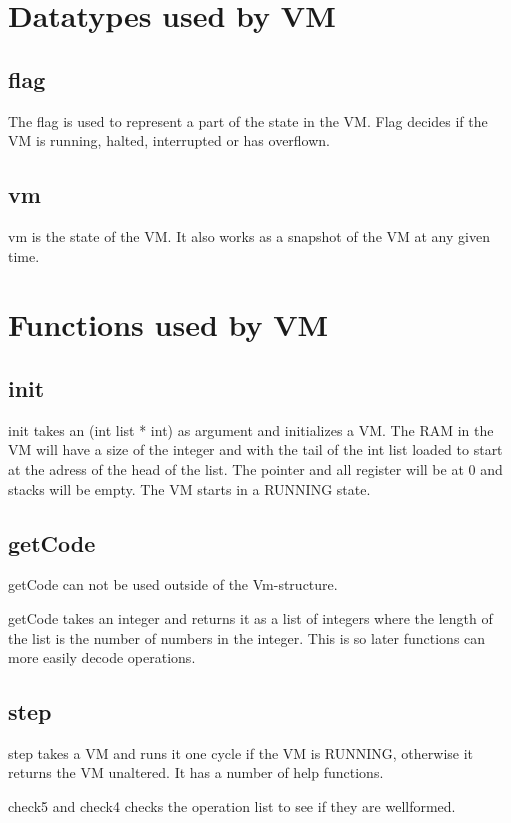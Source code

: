 \section{Datatypes used by VM}

\subsection{flag}
The flag is used to represent a part of the state in the VM. Flag decides if the VM is running, halted, interrupted or has overflown.

\subsection{vm}
vm is the state of the VM. It also works as a snapshot of the VM at any given time. 

\section{Functions used by VM}

\subsection{init}
init takes an (int list * int) as argument and initializes a VM. The RAM in the VM will have a size of the integer and with the tail of the int list loaded to start at the adress of the head of the list. The pointer and all register will be at 0 and stacks will be empty. The VM starts in a RUNNING state.

\subsection{getCode}
getCode can not be used outside of the Vm-structure. 

getCode takes an integer and returns it as a list of integers where the length of the list is the number of numbers in the integer. This is so later functions can more easily decode operations.

\subsection{step}
step takes a VM and runs it one cycle if the VM is RUNNING, otherwise it returns the VM unaltered. It has a number of help functions.

check5 and check4 checks the operation list to see if they are wellformed.

